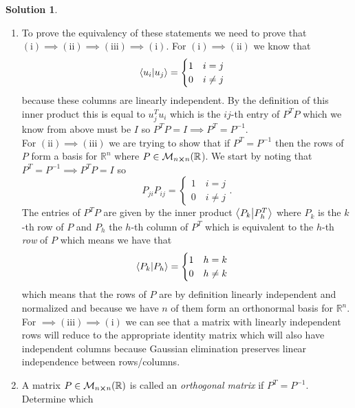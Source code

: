 \documentclass[10pt]{article}
\theoremstyle{definition}
\newtheorem{soln}{Solution}
\begin{document}
\begin{soln}~
  \begin{enumerate}[label=(\alph*)]
    \item To prove the equivalency of these statements we need to prove that $(\mathrm{i})\implies(\mathrm{ii})\implies(\mathrm{iii})\implies(\mathrm{i})$.
          For $(\mathrm{i})\implies(\mathrm{ii})$ we know that
          $$\braket{u_i}{u_j}=\begin{cases}
              1\quad i=j \\
              0\quad i\neq j
            \end{cases}$$
          because these columns are linearly independent. By the definition of this inner product this is equal to $u_j^Tu_i$ which is the $ij$-th entry of
          $P^TP$ which we know from above must be $I$ so $P^TP=I\implies P^T=P^{-1}$.
          \\
          For $(\mathrm{ii})\implies(\mathrm{iii})$ we are trying to show that if $P^T=P^{-1}$ then the rows of $P$ form a basis for $\mathbb{R}^n$
          where $P\in\mathcal{M}_{n\cross n}(\mathbb{R}$). We start by noting that $P^T=P^{-1}\implies P^TP=I$ so
            $$P_{ji}P_{ij}=\begin{cases}
                1\quad i=j \\
                0\quad i\neq j
              \end{cases}.$$
            The entries of $P^TP$ are given by the inner product $\braket{P_k}{P_h^T}$ where $P_k$ is the $k$-th row of $P$ and $P_h$ the $h$-th column of $P^T$ which is equivalent
            to the $h$-th \emph{row} of $P$ which means we have that
            $$\braket{P_k}{P_h}=\begin{cases}
                1\quad h=k \\
                0\quad h\neq k
              \end{cases}$$
            which means that the rows of $P$ are by definition linearly independent and normalized and because we have $n$ of them form an orthonormal basis for $\mathbb{R}^n$.\\
            For $\implies(\mathrm{iii})\implies(\mathrm{i})$ we can see that a matrix with linearly independent rows will reduce to the appropriate identity matrix which will also
          have independent columns because Gaussian elimination preserves linear independence between rows/columns.
    \item A matrix $P\in\mathcal{M}_{n\cross n}(\mathbb{R})$ is called an \emph{orthogonal matrix} if $P^T=P^{-1}$. Determine which

\end{enumerate}
\end{soln}
\end{document}
